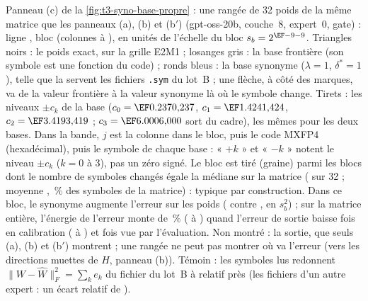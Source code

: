 {Panneau (c) de la \cref{fig:t3-syno-base-propre} : une rangée de 32 poids de la même matrice que les panneaux (a), (b) et (b$'$) (gpt-oss-20b,
couche~8, expert~0, gate) : ligne \LatRangLigne, bloc \LatRangBloc{} (colonnes \LatRangColA{} à \LatRangColB), en
unités de l'échelle du bloc $s_b=2^{\LatRangExpoRel}$. Triangles noirs : le poids exact, sur la grille E2M1 ; losanges
gris : la base frontière (son symbole est une fonction du code) ; ronds bleus : la base synonyme ($\lambda=1$,
$\delta^\ast=1$), telle que la servent les fichiers \texttt{.sym} du lot~B ; une flèche, à côté des marques, va de la valeur frontière à la
valeur synonyme là où le symbole change. Tirets : les niveaux $\pm c_k$ de la base ($c_0=\LatCentreUn$,
$c_1=\LatCentreDeux$, $c_2=\LatCentreTrois$ ; $c_3=\LatCentreQuatre$ sort du cadre), les mêmes pour les deux bases.
Dans la bande, $j$ est la colonne dans le bloc, puis le code MXFP4 (hexadécimal), puis le symbole de chaque base :
« $+k$ » et « $-k$ » notent le niveau $\pm c_k$ ($k=0$ à $3$), pas un zéro signé. Le bloc est tiré (graine) parmi les
\LatRangCandidats{} blocs dont le nombre de symboles changés égale la médiane sur la matrice (\LatRangMediane{} sur 32 ;
moyenne \LatRangMoyenne, \LatRangPartMatrice\,\% des symboles de la matrice) : typique par construction. Dans ce bloc,
le synonyme augmente l'erreur sur les poids (\LatRangErrS{} contre \LatRangErrF, en $s_b^2$) ; sur la matrice entière,
l'énergie de l'erreur monte de \LatSpecEnergieHausse\,\% (\LatSpecEnergieF{} à \LatSpecEnergieS) quand l'erreur de
sortie baisse \LatSpecCalibRapport{} fois en calibration (\LatSpecCalibF{} à \LatSpecCalibS) et
\LatSpecEvalRapport{} fois vue par l'évaluation. Non montré : la sortie, que seuls (a), (b) et (b$'$) montrent ; une rangée ne
peut pas montrer où va l'erreur (vers les directions muettes de $H$, panneau (b)). Témoin : les symboles lus redonnent
$\lVert W-\hat W\rVert_F^2=\sum_k e_k$ du fichier du lot~B à \LatRangTemoin{} relatif près (les fichiers d'un autre
expert : un écart relatif de \LatRangCassure).}

